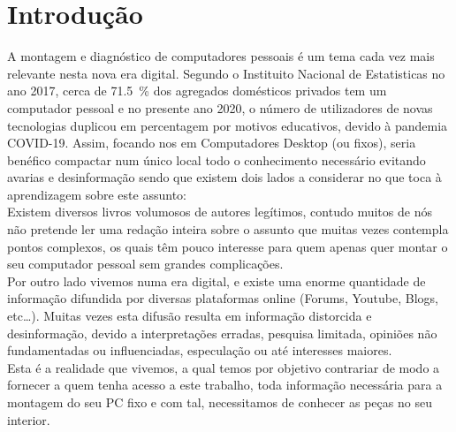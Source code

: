  
	
	
	
	
	
	
	
	\renewcommand{\contentsname}{Índice}
	\tableofcontents
	\listoffigures

\pagestyle{fancy}
\fancyhf{}
\rhead{\titulo}
\cfoot{\thepage}


\chapter{Introdução}
\label{chap.introdução}
\begin{multicols}{2}
A montagem e diagnóstico de computadores pessoais é um tema cada vez mais relevante nesta nova era digital. Segundo o Instituito Nacional de Estatisticas no ano 2017, cerca de 71.5~\% dos agregados domésticos privados tem um computador pessoal e no presente ano 2020, o número de utilizadores de novas tecnologias duplicou em percentagem por motivos educativos, devido à pandemia COVID-19.  Assim, focando nos em Computadores Desktop (ou fixos), seria benéfico compactar num único local todo o conhecimento necessário evitando avarias e desinformação sendo que existem dois lados a considerar no que toca à aprendizagem sobre este assunto:\\
Existem diversos livros volumosos de autores legítimos, contudo muitos de nós não pretende ler uma redação inteira sobre o assunto que muitas vezes contempla pontos complexos, os quais têm pouco interesse para quem apenas quer montar o seu computador pessoal sem grandes complicações.\\
Por outro lado vivemos numa era digital, e existe uma enorme quantidade de informação difundida por diversas plataformas online (Forums, Youtube, Blogs, etc…). Muitas vezes esta difusão resulta em informação distorcida e desinformação, devido a interpretações erradas, pesquisa limitada, opiniões não fundamentadas ou influenciadas, especulação ou até interesses maiores.\\
Esta é a realidade que vivemos, a qual temos por objetivo contrariar de modo a fornecer a quem tenha acesso a este trabalho, toda informação necessária para a montagem do seu PC fixo e com tal, necessitamos de conhecer as peças no seu interior. 
\end{multicols}

